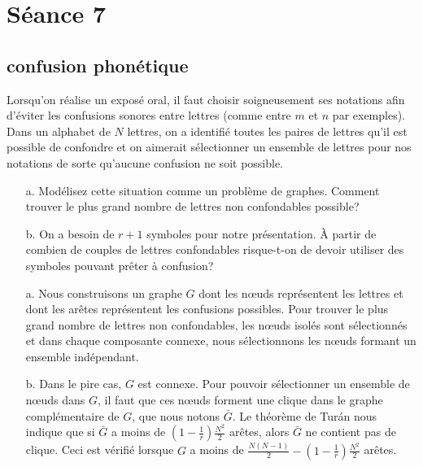 %

\section{Séance 7}

\subsection{confusion phonétique}
Lorsqu'on réalise un exposé oral, il faut choisir soigneusement ses notations afin d'éviter les confusions sonores entre lettres (comme entre $m$ et $n$ par exemples). Dans un alphabet de $N$ lettres, on a identifié toutes les paires de lettres qu'il est possible de confondre et on aimerait sélectionner un ensemble de lettres pour nos notations de sorte qu'aucune confusion ne soit possible.

\begin{enumerate}
  \item[a.] Modélisez cette situation comme un problème de graphes. Comment trouver le plus grand nombre de lettres non confondables possible?
  \item[b.] On a besoin de $r+1$ symboles pour notre présentation. À partir de combien de couples de lettres confondables risque-t-on de devoir utiliser des symboles pouvant prêter à confusion?
\end{enumerate}

\begin{solution}
\begin{enumerate}
\item[a.]
Nous construisons un graphe $G$ dont les nœuds représentent les lettres et dont les arêtes représentent les confusions possibles. Pour trouver le plus grand nombre de lettres non confondables, les nœuds isolés sont sélectionnés et dans chaque composante connexe, nous sélectionnons les nœuds formant un ensemble indépendant.

\item[b.]
Dans le pire cas, $G$ est connexe. Pour pouvoir sélectionner un ensemble de nœuds dans $G$, il faut que ces nœuds forment une clique dans le graphe complémentaire de $G$, que nous notons $\bar{G}$. Le théorème de Turán nous indique que si $\bar{G}$ a moins de $\left(1-\frac{1}{r}\right)\frac{N^2}{2}$ arêtes, alors $\bar{G}$ ne contient pas de clique. Ceci est vérifié lorsque $G$ a moins de $\frac{N(N-1)}{2}-\left(1-\frac{1}{r}\right)\frac{N^2}{2}$ arêtes.

\end{enumerate}
\end{solution}

